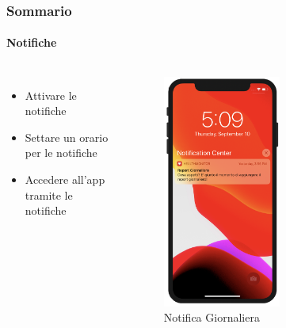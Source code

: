 \documentclass{beamer}
\begin{document}
\begin{frame}
\frametitle{Sommario}
\framesubtitle{Notifiche}
\begin{columns}
  \begin{itemize}
	\item Attivare le notifiche
	\item Settare un orario per le notifiche
	\item Accedere all'app tramite le notifiche
  \end{itemize}
	\begin{figure}[h]
	\centering
        \includegraphics[width=0.55\textwidth]{../img/notifiche3.png}
        \caption{Notifica Giornaliera}
   \end{figure}
\end{columns}
\end{frame}
\end{document}
